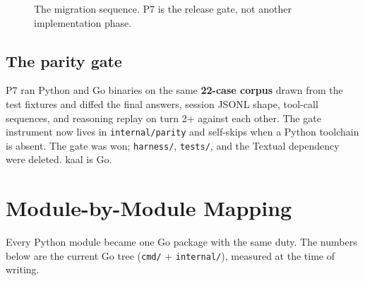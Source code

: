 \documentclass[11pt,a4paper]{article}
\begin{document}
\begin{figure}[ht]
\centering
{}
\caption{The migration sequence. P7 is the release gate, not another implementation phase.}
\label{fig:timeline}
\end{figure}

\subsection{The parity gate}
\noindent
P7 ran Python and Go binaries on the same \textbf{22-case corpus} drawn from the test fixtures and diffed the final answers, session JSONL shape, tool-call sequences, and reasoning replay on turn 2+ against each other. The gate instrument now lives in \texttt{internal/parity} and self-skips when a Python toolchain is absent. The gate was won; \texttt{harness/}, \texttt{tests/}, and the Textual dependency were deleted. kaal is Go.

\section{Module-by-Module Mapping}

\noindent
Every Python module became one Go package with the same duty. The numbers below are the current Go tree (\texttt{cmd/} + \texttt{internal/}), measured at the time of writing.
\end{document}
